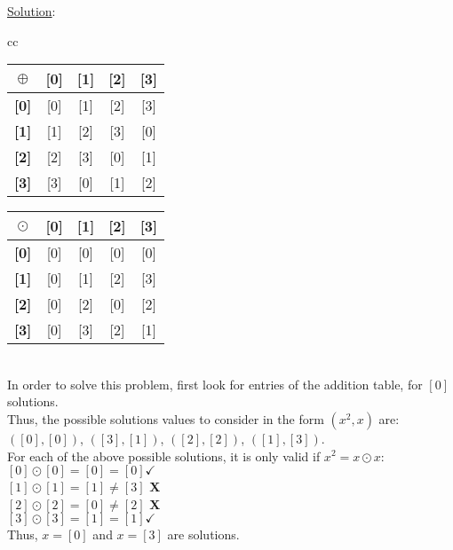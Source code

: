 \documentclass{article} %
\begin{document}
\underline{Solution}: 
\begin{addmargin}[1em]{0em}
\begin{tabular}{cc}
\begin{tabular}{|c|c|c|c|c|}
\hline
\textbf{$\oplus$}&\textbf{[0]}&\textbf{[1]}&\textbf{[2]}&\textbf{[3]}\\ \hline
\textbf{[0]} & [0] & [1] & [2] & [3] \\ \hline
\textbf{[1]} & [1] & [2] & [3] & [0] \\ \hline
\textbf{[2]} & [2] & [3] & [0] & [1] \\ \hline
\textbf{[3]} & [3] & [0] & [1] & [2] \\ \hline

\end{tabular}

\quad

\begin{tabular}{|c|c|c|c|c|}
\hline
\textbf{$\odot$}&\textbf{[0]}&\textbf{[1]}&\textbf{[2]}&\textbf{[3]}\\ \hline
\textbf{[0]} & [0] & [0] & [0] & [0] \\ \hline
\textbf{[1]} & [0] & [1] & [2] & [3] \\ \hline
\textbf{[2]} & [0] & [2] & [0] & [2] \\ \hline
\textbf{[3]} & [0] & [3] & [2] & [1] \\ \hline
\end{tabular}
\end{tabular}
\\ \break
In order to solve this problem, first look for entries of the addition table, for $[0]$ solutions.
\\Thus, the possible solutions values to consider in the form $(x^2, x)$ are: $([0],[0])$, $([3],[1])$, $([2],[2])$, $([1],[3])$.
\\For each of the above possible solutions, it is only valid if $x^2 = x \odot x$:
\\$[0] \odot [0] = [0] = [0] \checkmark$
\\$[1] \odot [1] = [1] \neq [3]$ \textbf{X}
\\$[2] \odot [2] = [0] \neq [2]$ \textbf{X}
\\$[3] \odot [3] = [1] = [1] \checkmark$
\\Thus, $x = [0]$ and $x = [3]$ are solutions.

\begin{addmargin}[1em]{0em}
\end{addmargin}
\end{addmargin}
\end{document}
